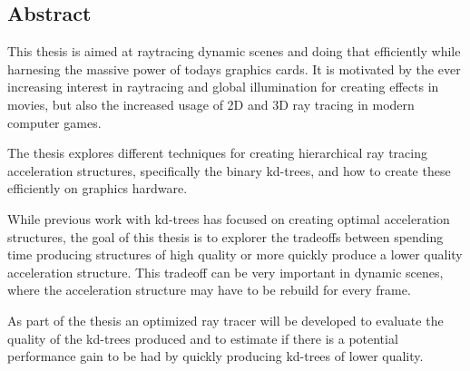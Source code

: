 

\begin{center}
\begin{minipage}{0.7\textwidth}
\section*{Abstract}

This thesis is aimed at raytracing dynamic scenes and doing that efficiently
while harnesing the massive power of todays graphics cards. It is motivated by
the ever increasing interest in raytracing and global illumination for creating
effects in movies, but also the increased usage of 2D and 3D ray tracing in
modern computer games.

The thesis explores different techniques for creating hierarchical ray tracing
acceleration structures, specifically the binary kd-trees, and how to create
these efficiently on graphics hardware.


While previous work with kd-trees has focused on creating optimal acceleration
structures, the goal of this thesis is to explorer the tradeoffs between
spending time producing structures of high quality or more quickly produce a
lower quality acceleration structure. This tradeoff can be very important in
dynamic scenes, where the acceleration structure may have to be rebuild for
every frame.

As part of the thesis an optimized ray tracer will be developed to evaluate the
quality of the kd-trees produced and to estimate if there is a potential
performance gain to be had by quickly producing kd-trees of lower quality.

\end{minipage}
\end{center}










